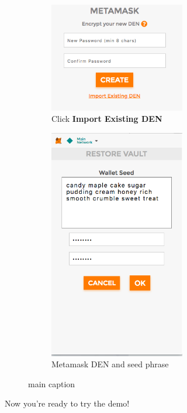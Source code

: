 \begin{figure}[H]
	\centering
	\begin{subfigure}{0.48\textwidth}
		\centering\includegraphics[width=0.65\textwidth]{img/import.png}
		\caption{Click \textbf{Import Existing DEN}}\label{fig:metamask2a}
	\end{subfigure}
	\begin{subfigure}{0.48\textwidth}
		\centering\includegraphics[width=0.65\textwidth]{img/stringPsw.png}
		\caption{Metamask DEN and seed phrase}\label{fig:metamask2b}
	\end{subfigure}
	\caption{main caption}
	\label{fig:metamask2}
\end{figure}

Now you're ready to try the demo!